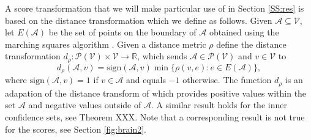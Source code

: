 A score transformation that we will make particular use of in Section \ref{SS:res} is based on the distance transformation which we define as follows. Given $\mathcal{A} \subseteq \mathcal{V}$, let $E(\mathcal{A})$ be the set of points on the boundary of $\mathcal{A}$ obtained using the marching squares algorithm \citep{Maple2003}. Given a distance metric $\rho$ define the distance transformation $d_{\rho}: \mathcal{P}(\mathcal{V}) \times \mathcal{V}\rightarrow \mathbb{R}$, which sends $\mathcal{A} \in \mathcal{P}(\mathcal{V})$ and $v\in \mathcal{V}$ to
\begin{equation*}
	d_{\rho}(\mathcal{A}, v) = \text{sign}(\mathcal{A}, v)\min\lbrace \rho(v, e): e \in E(\mathcal{A})\rbrace, 
\end{equation*}
where $ \text{sign}(\mathcal{A}, v) = 1 $ if $v\in \mathcal{A}$ and equals $-1$ otherwise. The function $d_{\rho}$ is an adapation of the distance transform of \cite{Borgefors1986} which provides positive values within the set $\mathcal{A}$ and negative values outside of $\mathcal{A}$. 
A similar result holds for the inner confidence sets, see Theorem XXX. Note that a corresponding result is not true for the  scores, see Section \ref{fig:brain2}. 
